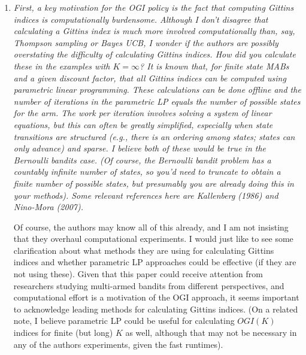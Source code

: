 \documentclass[11pt]{article}
\newcommand{\1}{\ensuremath{\mathbf{1}}} %
\theoremstyle{thm-sf}
\begin{document}
	
	\begin{enumerate}
		
		\item {\it First, a key motivation for the OGI policy is the fact that computing Gittins indices is computationally burdensome. Although I don't disagree that calculating a Gittins index is much more involved computationally than, say, Thompson sampling or Bayes UCB, I wonder if the authors are possibly overstating the difficulty of calculating Gittins indices. How did you calculate these in the examples with $K=\infty$? It is known that, for finite state MABs and a given discount factor, that all Gittins indices can be computed using parametric linear programming. These calculations can be done offline and the number of iterations in the parametric LP equals the number of possible states for the arm. The work per iteration involves solving a system of linear equations, but this can often be greatly simplified, especially when state transitions are structured (e.g., there is an ordering among states; states can only advance) and sparse. I believe both of these would be true in the Bernoulli bandits case. (Of course, the Bernoulli bandit problem has a countably infinite number of states, so you'd need to truncate to obtain a finite number of possible states, but presumably you are already doing this in your methods). Some relevant references here are Kallenberg (1986) and Nino-Mora (2007).
			
		Of course, the authors may know all of this already, and I am not insisting that they overhaul computational experiments. I would just like to see some clarification about what methods they are using for calculating Gittins indices and whether parametric LP approaches could be effective (if they are not using these). Given that this paper could receive attention from researchers studying multi-armed bandits from different perspectives, and computational effort is a motivation of the OGI approach, it seems important to acknowledge leading methods for calculating Gittins indices. (On a related note, I believe parametric LP could be useful for calculating $OGI(K)$ indices for finite (but long) $K$ as well, although that may not be necessary in any of the authors experiments, given the fast runtimes).

		}
		

\end{enumerate}
\end{document}
